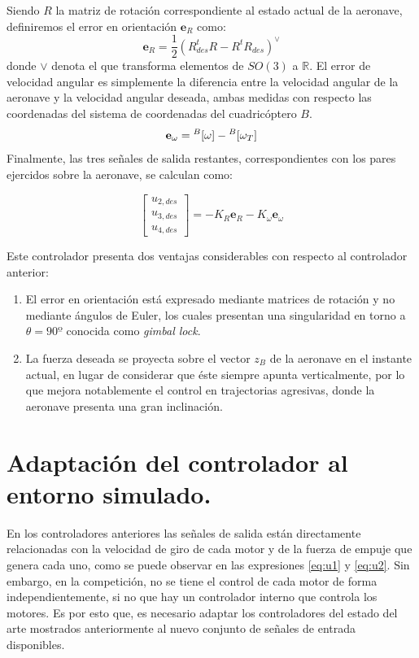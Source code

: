 Siendo $R$ la matriz de rotación correspondiente al estado actual de la aeronave, definiremos el error en orientación $\mathbf{e}_R $ como:
\begin{equation}
	\mathbf{e}_R = \frac{1}{2}\left(R_{des}^t R - R^t R_{des} \right)^\vee
\end{equation}
donde $\vee$ denota el  que transforma elementos de $SO(3)$ a $\mathbb{R}$. El error de velocidad angular es simplemente la diferencia entre la velocidad angular de la aeronave y la velocidad angular deseada, ambas medidas con respecto las coordenadas del sistema de coordenadas del cuadricóptero $B$.
\begin{equation}
	\mathbf{e}_\omega = \null^B[\omega]-\null^B[\omega_T] 
\end{equation}
Finalmente, las tres señales de salida restantes, correspondientes con los pares ejercidos sobre la aeronave, se calculan como:

\begin{equation}
	\label{eq:u2_non_linearized}
\begin{bmatrix}
	u_{2,des}\\u_{3,des}\\u_{4,des} 
\end{bmatrix}= -K_R	\mathbf{e}_R - K_\omega	\mathbf{e}_\omega
\end{equation}

Este controlador presenta dos ventajas considerables con respecto al controlador anterior:
\begin{enumerate}
	\item El error en orientación está expresado mediante matrices de rotación y no mediante ángulos de Euler, los cuales presentan una singularidad en torno a $\theta = 90º$ conocida como \textit{gimbal lock}.
	\item La fuerza deseada se proyecta sobre el vector $z_B$ de la aeronave en el instante actual, en lugar de considerar que éste siempre apunta verticalmente, por lo que mejora notablemente el control en trajectorias agresivas, donde la aeronave presenta una gran inclinación.
\end{enumerate}


\section{Adaptación del controlador al entorno simulado.}

En los controladores anteriores las señales de salida están directamente relacionadas con la velocidad de giro de cada motor y de la fuerza de empuje que genera cada uno, como se puede observar en las expresiones \ref{eq:u1} y \ref{eq:u2}. Sin embargo, en la competición, no se tiene el control de cada motor de forma independientemente, si no que hay un controlador interno que controla los motores. Es por esto que, es necesario adaptar los controladores del estado del arte mostrados anteriormente al nuevo conjunto de señales de entrada disponibles.

